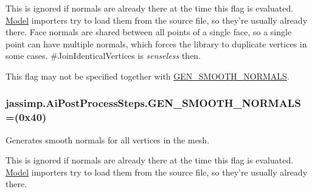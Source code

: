 This is ignored if normals are already there at the time this flag is evaluated. \hyperlink{class_model}{Model} importers try to load them from the source file, so they're usually already there. Face normals are shared between all points of a single face, so a single point can have multiple normals, which forces the library to duplicate vertices in some cases. \#\+Join\+Identical\+Vertices is {\itshape senseless} then.

This flag may not be specified together with \hyperlink{enumjassimp_1_1_ai_post_process_steps_a8467855f4e3d97235e27954a9c983fd4}{G\+E\+N\+\_\+\+S\+M\+O\+O\+T\+H\+\_\+\+N\+O\+R\+M\+A\+L\+S}. \hypertarget{enumjassimp_1_1_ai_post_process_steps_a8467855f4e3d97235e27954a9c983fd4}{
\subsubsection[{G\+E\+N\+\_\+\+S\+M\+O\+O\+T\+H\+\_\+\+N\+O\+R\+M\+A\+L\+S}]{\setlength{\rightskip}{0pt plus 5cm}jassimp.\+Ai\+Post\+Process\+Steps.\+G\+E\+N\+\_\+\+S\+M\+O\+O\+T\+H\+\_\+\+N\+O\+R\+M\+A\+L\+S =(0x40)}}\label{enumjassimp_1_1_ai_post_process_steps_a8467855f4e3d97235e27954a9c983fd4}
Generates smooth normals for all vertices in the mesh.

This is ignored if normals are already there at the time this flag is evaluated. \hyperlink{class_model}{Model} importers try to load them from the source file, so they're usually already there.


